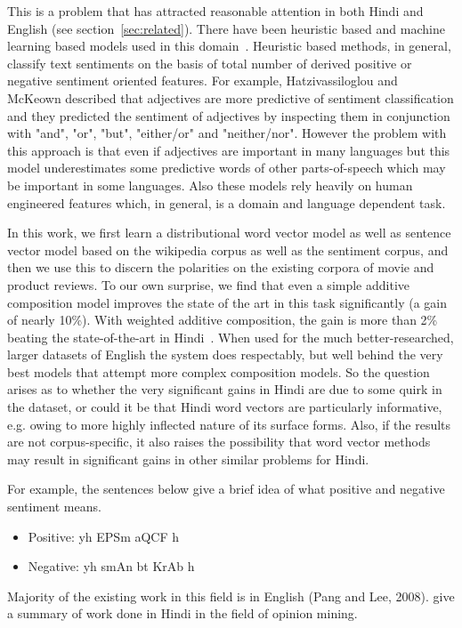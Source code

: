 This is a problem that has attracted reasonable attention in both Hindi and English (see section~\ref{sec:related}). There have been heuristic based and machine learning based models used in this domain~\cite{Wang:14}. Heuristic based methods, in general, classify text sentiments on the basis of total number of derived positive or negative sentiment oriented features. For example, Hatzivassiloglou and McKeown \cite{Hatzivassiloglou:97} described that adjectives are more predictive of sentiment classification and they predicted the sentiment of adjectives by inspecting them in conjunction with "and", "or", "but", "either/or" and "neither/nor". However the problem with this approach is that even if adjectives  are important in many languages but this model underestimates some predictive words of other parts-of-speech which may be important in some languages. Also these models rely heavily on human engineered features which, in general, is a domain and language dependent task.

In this work, we first learn a distributional word vector model as well as sentence vector model based on the wikipedia corpus as well as the sentiment corpus, and then we use this to discern the polarities on the existing corpora of movie and product reviews. To our own surprise, we find that even a simple additive composition model improves the state of the art in this task significantly (a gain of nearly 10\%). With weighted additive composition, the gain is more than 2\% beating the state-of-the-art in Hindi~\cite{Singh:15}. When used for the much better-researched, larger datasets of English the system does respectably, but well behind the very best models that attempt more complex composition models. So the question arises as to whether the very significant gains in Hindi are due to some quirk in the dataset, or could it be that Hindi word vectors are particularly informative,
e.g. owing to more highly inflected nature of its surface forms.  Also, if the results are not corpus-specific, it also raises the possibility that word vector methods may result in significant gains in
other similar problems for Hindi. 

For example, the sentences below give a brief idea of what positive and negative sentiment means.
\begin{itemize}
\item Positive: {\dn yh EPSm aQCF h\4}
\item Negative: {\dn yh smAn bt KrAb h\4}
\end{itemize}
Majority of the existing work in this field is in English (Pang and Lee, 2008). \cite{Sharma:14} give a summary of work done in Hindi in the field of opinion mining.

